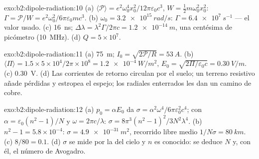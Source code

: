 \begin{solution}{exo:b2:dipole-radiation:10}
(a) $\langle\mathcal P\rangle = e^2\omega_0^4x_0^2/12\pi\varepsilon_0c^3$, $W = \tfrac12m\omega_0^2x_0^2$:
$\Gamma = \mathcal P/W = e^2\omega_0^2/6\pi\varepsilon_0mc^3$. (b) $\omega_0 = \qty{3.2e15}{rad/s}$: $\Gamma =
\qty{6.4e7}{s^{-1}}$ --- el valor usado. (c) \qty{16}{ns}; $\Delta\lambda = \lambda^2\Gamma/2\pi c =
\qty{1.2e-14}{m}$, una centésima de picómetro (\qty{10}{MHz}). (d) $Q = 5 \times 10^7$.
\end{solution}

\begin{solution}{exo:b2:dipole-radiation:11}
(a) \qty{75}{m}; $I_0 = \sqrt{2\mathcal P/R} = \qty{53}{A}$. (b) $\langle\Pi\rangle = 1.5 \times
5 \times 10^4/2\pi \times 10^8 = \qty{1.2e-4}{W/m^2}$, $E_0 = \sqrt{2\Pi/\varepsilon_0c} = \qty{0.30}{V/m}$.
(c) \qty{0.30}{V}. (d) Las corrientes de retorno circulan por el suelo; un
terreno resistivo añade pérdidas y estropea el espejo; los radiales enterrados les dan un
camino de cobre.
\end{solution}

\begin{solution}{exo:b2:dipole-radiation:12}
(a) $p_0 = \alpha E_0$ da $\sigma = \alpha^2\omega^4/6\pi\varepsilon_0^2c^4$; con $\alpha = \varepsilon_0(n^2
- 1)/N$ y $\omega = 2\pi c/\lambda$: $\sigma = 8\pi^3(n^2 - 1)^2/3N^2\lambda^4$. (b) $n^2 - 1 =
5.8 \times 10^{-4}$: $\sigma = \qty{4.9e-31}{m^2}$, recorrido libre medio $1/N\sigma = \qty{80}{km}$. (c)
$8/80 = 0.1$. (d) $\sigma$ se mide por la  del cielo y $n$ es
conocido: se deduce $N$ y, con él, el número de Avogadro.
\end{solution}

